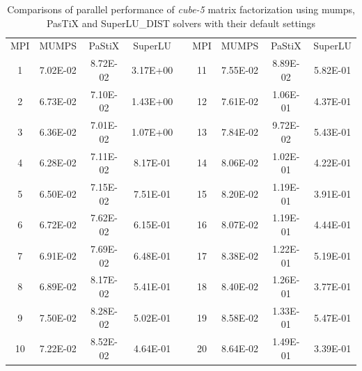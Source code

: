 \begin{table}[ht]
\centering
\begin{tabular}{|c|c|c|c|l|c|c|c|c|}
\cline{1-4} \cline{6-9}
MPI & MUMPS    & PaStiX   & SuperLU  &  & MPI & MUMPS    & PaStiX   & SuperLU  \\ \cline{1-4} \cline{6-9} 
1   & 7.02E-02 & 8.72E-02 & 3.17E+00 &  & 11  & 7.55E-02 & 8.89E-02 & 5.82E-01 \\ \cline{1-4} \cline{6-9} 
2   & 6.73E-02 & 7.10E-02 & 1.43E+00 &  & 12  & 7.61E-02 & 1.06E-01 & 4.37E-01 \\ \cline{1-4} \cline{6-9} 
3   & 6.36E-02 & 7.01E-02 & 1.07E+00 &  & 13  & 7.84E-02 & 9.72E-02 & 5.43E-01 \\ \cline{1-4} \cline{6-9} 
4   & 6.28E-02 & 7.11E-02 & 8.17E-01 &  & 14  & 8.06E-02 & 1.02E-01 & 4.22E-01 \\ \cline{1-4} \cline{6-9} 
5   & 6.50E-02 & 7.15E-02 & 7.51E-01 &  & 15  & 8.20E-02 & 1.19E-01 & 3.91E-01 \\ \cline{1-4} \cline{6-9} 
6   & 6.72E-02 & 7.62E-02 & 6.15E-01 &  & 16  & 8.07E-02 & 1.19E-01 & 4.44E-01 \\ \cline{1-4} \cline{6-9} 
7   & 6.91E-02 & 7.69E-02 & 6.48E-01 &  & 17  & 8.38E-02 & 1.22E-01 & 5.19E-01 \\ \cline{1-4} \cline{6-9} 
8   & 6.89E-02 & 8.17E-02 & 5.41E-01 &  & 18  & 8.40E-02 & 1.26E-01 & 3.77E-01 \\ \cline{1-4} \cline{6-9} 
9   & 7.50E-02 & 8.28E-02 & 5.02E-01 &  & 19  & 8.58E-02 & 1.33E-01 & 5.47E-01 \\ \cline{1-4} \cline{6-9} 
10  & 7.22E-02 & 8.52E-02 & 4.64E-01 &  & 20  & 8.64E-02 & 1.49E-01 & 3.39E-01 \\ \cline{1-4} \cline{6-9} 
\end{tabular}
\caption{Comparisons of parallel performance of  \textit{cube-5} matrix factorization using \gls{mumps}, PasTiX and SuperLU\_DIST solvers with their default settings}
\label{table:lc-cube-5-result}
\end{table}


